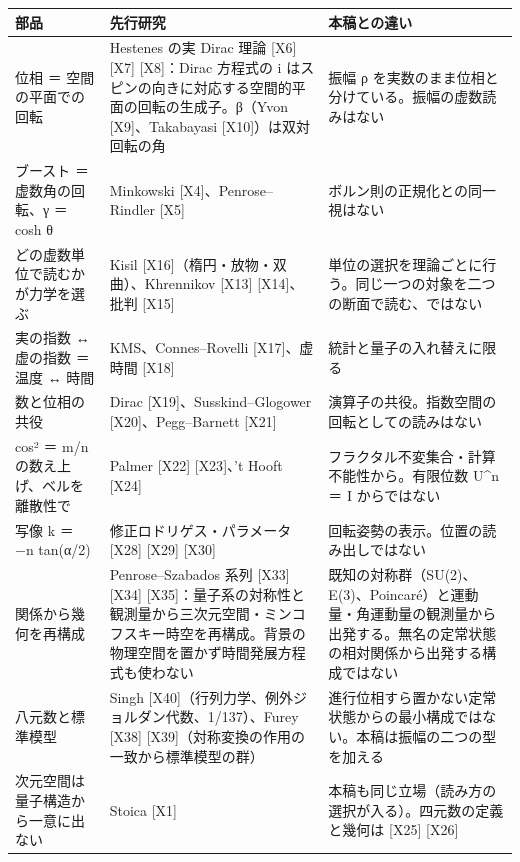 \documentclass[
  a4paper,
]{ltjsarticle}
\newcounter{none} %
\begin{document}
{\def\LTcaptype{none} %
\begin{longtable}[]{@{}
  >{\raggedright\arraybackslash}p{}
  >{\raggedright\arraybackslash}p{}
  >{\raggedright\arraybackslash}p{}@{}}
\toprule\noalign{}
\begin{minipage}[b]{\linewidth}\raggedright
部品
\end{minipage} & \begin{minipage}[b]{\linewidth}\raggedright
先行研究
\end{minipage} & \begin{minipage}[b]{\linewidth}\raggedright
本稿との違い
\end{minipage} \\
\midrule\noalign{}
\endhead
\bottomrule\noalign{}
\endlastfoot
位相 ＝ 空間の平面での回転 & Hestenes の実 Dirac 理論 {[}X6{]} {[}X7{]}
{[}X8{]}：Dirac 方程式の i
はスピンの向きに対応する空間的平面の回転の生成子。β（Yvon
{[}X9{]}、Takabayasi {[}X10{]}）は双対回転の角 & 振幅 ρ
を実数のまま位相と分けている。振幅の虚数読みはない \\
ブースト ＝ 虚数角の回転、γ ＝ cosh θ & Minkowski
{[}X4{]}、Penrose--Rindler {[}X5{]} &
ボルン則の正規化との同一視はない \\
どの虚数単位で読むかが力学を選ぶ & Kisil
{[}X16{]}（楕円・放物・双曲）、Khrennikov {[}X13{]} {[}X14{]}、批判
{[}X15{]} &
単位の選択を理論ごとに行う。同じ一つの対象を二つの断面で読む、ではない \\
実の指数 ↔ 虚の指数 ＝ 温度 ↔ 時間 & KMS、Connes--Rovelli
{[}X17{]}、虚時間 {[}X18{]} & 統計と量子の入れ替えに限る \\
数と位相の共役 & Dirac {[}X19{]}、Susskind--Glogower
{[}X20{]}、Pegg--Barnett {[}X21{]} &
演算子の共役。指数空間の回転としての読みはない \\
cos² ＝ m/n の数え上げ、ベルを離散性で & Palmer {[}X22{]} {[}X23{]}、't
Hooft {[}X24{]} & フラクタル不変集合・計算不能性から。有限位数 U\^{}n ＝
I からではない \\
写像 k ＝ −n tan(α/2) & 修正ロドリゲス・パラメータ {[}X28{]} {[}X29{]}
{[}X30{]} & 回転姿勢の表示。位置の読み出しではない \\
関係から幾何を再構成 & Penrose--Szabados 系列 {[}X33{]} {[}X34{]}
{[}X35{]}：量子系の対称性と観測量から三次元空間・ミンコフスキー時空を再構成。背景の物理空間を置かず時間発展方程式も使わない
&
既知の対称群（SU(2)、E(3)、Poincaré）と運動量・角運動量の観測量から出発する。無名の定常状態の相対関係から出発する構成ではない \\
八元数と標準模型 & Singh
{[}X40{]}（行列力学、例外ジョルダン代数、1/137）、Furey {[}X38{]}
{[}X39{]}（対称変換の作用の一致から標準模型の群） &
進行位相すら置かない定常状態からの最小構成ではない。本稿は振幅の二つの型を加える \\
3 次元空間は量子構造から一意に出ない & Stoica {[}X1{]} &
本稿も同じ立場（読み方の選択が入る）。四元数の定義と幾何は {[}X25{]}
{[}X26{]} \\
\end{longtable}
}
\end{document}
